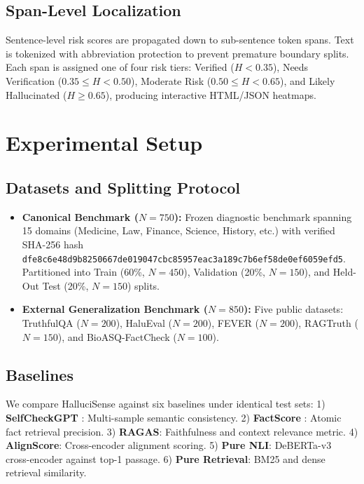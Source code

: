 \documentclass[conference]{IEEEtran}
\begin{document}
\subsection{Span-Level Localization}
Sentence-level risk scores are propagated down to sub-sentence token spans. Text is tokenized with abbreviation protection to prevent premature boundary splits. Each span is assigned one of four risk tiers: Verified ($H < 0.35$), Needs Verification ($0.35 \le H < 0.50$), Moderate Risk ($0.50 \le H < 0.65$), and Likely Hallucinated ($H \ge 0.65$), producing interactive HTML/JSON heatmaps.

\section{Experimental Setup}
\label{sec:experimental_setup}

\subsection{Datasets and Splitting Protocol}
\begin{itemize}
    \item \textbf{Canonical Benchmark ($N=750$):} Frozen diagnostic benchmark spanning 15 domains (Medicine, Law, Finance, Science, History, etc.) with verified SHA-256 hash \texttt{dfe8c6e48d9b8250667de019047cbc85957eac3a189c7b6ef58de0ef6059efd5}. Partitioned into Train (60\%, $N=450$), Validation (20\%, $N=150$), and Held-Out Test (20\%, $N=150$) splits.
    \item \textbf{External Generalization Benchmark ($N=850$):} Five public datasets: TruthfulQA ($N=200$), HaluEval ($N=200$), FEVER ($N=200$), RAGTruth ($N=150$), and BioASQ-FactCheck ($N=100$).
\end{itemize}

\subsection{Baselines}
We compare HalluciSense against six baselines under identical test sets:
1) \textbf{SelfCheckGPT} \cite{manakul2023selfcheckgpt}: Multi-sample semantic consistency.
2) \textbf{FactScore} \cite{min2023factscore}: Atomic fact retrieval precision.
3) \textbf{RAGAS}: Faithfulness and context relevance metric.
4) \textbf{AlignScore}: Cross-encoder alignment scoring.
5) \textbf{Pure NLI}: DeBERTa-v3 cross-encoder against top-1 passage.
6) \textbf{Pure Retrieval}: BM25 and dense retrieval similarity.
\end{document}
